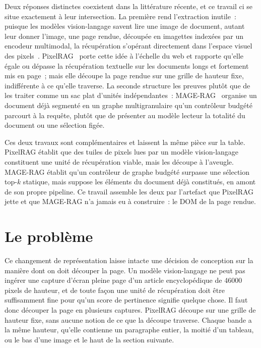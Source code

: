 Deux réponses distinctes coexistent dans la littérature récente, et ce
travail ci se situe exactement à leur intersection. La première rend
l'extraction inutile~: puisque les modèles vision-langage savent lire une
image de document, autant leur donner l'image, une page rendue, découpée en
imagettes indexées par un encodeur multimodal, la récupération s'opérant
directement dans l'espace visuel des pixels~\citep{dse2024, colpali2024}.
PixelRAG~\citep{pixelrag2026} porte cette idée à l'échelle du web et rapporte
qu'elle égale ou dépasse la récupération textuelle sur les documents longs et
fortement mis en page~; mais elle découpe la page rendue sur une grille de
hauteur fixe, indifférente à ce qu'elle traverse. La seconde structure les
preuves plutôt que de les traiter comme un sac plat d'unités indépendantes~:
MAGE-RAG~\citep{magerag2026} organise un document déjà segmenté en un graphe
multigranulaire qu'un contrôleur budgété parcourt à la requête, plutôt que de présenter au modèle lecteur la totalité du document ou une sélection figée.

Ces deux travaux sont complémentaires et laissent la même
pièce sur la table. PixelRAG établit que des tuiles de pixels lues par un
modèle vision-langage constituent une unité de récupération viable, mais les
découpe à l'aveugle. MAGE-RAG établit qu'un contrôleur de graphe budgété
surpasse une sélection top-$k$ statique, mais suppose les éléments du document
déjà constitués, en amont de son propre pipeline. Ce travail assemble les deux
par l'artefact que PixelRAG jette et que MAGE-RAG n'a jamais eu à construire~:
le DOM de la page rendue.

\section*{Le problème}

Ce changement de représentation laisse intacte une décision de conception
sur la manière dont on doit découper la page. Un modèle vision-langage
ne peut pas ingérer une capture d'écran pleine page d'un article
encyclopédique de \num{46000} pixels de hauteur, et de toute façon une unité de
récupération doit être suffisamment fine pour qu'un score de pertinence
signifie quelque chose. Il faut donc découper la page en plusieurs captures. PixelRAG découpe sur une
grille de hauteur fixe, sans aucune notion de ce que la découpe
traverse. Chaque bande a la même hauteur, qu'elle contienne un paragraphe
entier, la moitié d'un tableau, ou le bas d'une image et le haut de la section
suivante.

